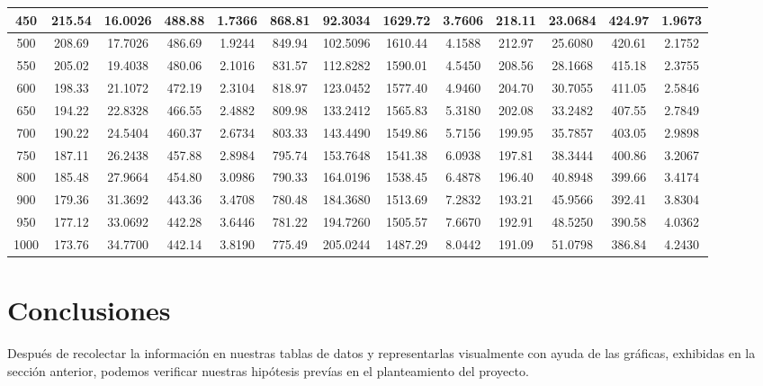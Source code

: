 \documentclass[12pt]{article}
\begin{document}
\begin{table}[ht]
{\begin{tabular}{ |c |c | c | c | c | c | c | c | c | c | c | c | c | }
      450
      & 215.54 & 16.0026 & 488.88 & 1.7366
      & 868.81 & 92.3034 & 1629.72 & 3.7606
      & 218.11 & 23.0684 & 424.97 & 1.9673 \\ \hline
      500
      & 208.69 & 17.7026 & 486.69 & 1.9244
      & 849.94 & 102.5096 & 1610.44 & 4.1588
      & 212.97 & 25.6080 & 420.61 & 2.1752 \\ \hline
      550
      & 205.02 & 19.4038 & 480.06 & 2.1016
      & 831.57 & 112.8282 & 1590.01 & 4.5450
      & 208.56 & 28.1668 & 415.18 & 2.3755 \\ \hline
      600
      & 198.33 & 21.1072 & 472.19 & 2.3104
      & 818.97 & 123.0452 & 1577.40 & 4.9460
      & 204.70 & 30.7055 & 411.05 & 2.5846 \\ \hline
      650
      & 194.22 & 22.8328 & 466.55 & 2.4882
      & 809.98 & 133.2412 & 1565.83 & 5.3180
      & 202.08 & 33.2482 & 407.55 & 2.7849 \\ \hline
      700
      & 190.22 & 24.5404 & 460.37 & 2.6734
      & 803.33 & 143.4490 & 1549.86 & 5.7156
      & 199.95 & 35.7857 & 403.05 & 2.9898 \\ \hline
      750
      & 187.11 & 26.2438 & 457.88 & 2.8984
      & 795.74 & 153.7648 & 1541.38 & 6.0938
      & 197.81 & 38.3444 & 400.86 & 3.2067 \\ \hline
      800
      & 185.48 & 27.9664 & 454.80 & 3.0986
      & 790.33 & 164.0196 & 1538.45 & 6.4878
      & 196.40 & 40.8948 & 399.66 & 3.4174 \\ \hline
      900
      & 179.36 & 31.3692 & 443.36 & 3.4708
      & 780.48 & 184.3680 & 1513.69 & 7.2832
      & 193.21 & 45.9566 & 392.41 & 3.8304 \\ \hline
      950
      & 177.12 & 33.0692 & 442.28 & 3.6446
      & 781.22 & 194.7260 & 1505.57 & 7.6670
      & 192.91 & 48.5250 & 390.58 & 4.0362 \\ \hline
      1000
      & 173.76 & 34.7700 & 442.14 & 3.8190
      & 775.49 & 205.0244 & 1487.29 & 8.0442
      & 191.09 & 51.0798 & 386.84 & 4.2430 \\ \hline
    \end{tabular}
  }
\end{table}
\newpage
\section{Conclusiones}
Después de recolectar la información en nuestras tablas de datos y representarlas visualmente con ayuda de las gráficas, exhibidas en la sección anterior, podemos verificar nuestras hipótesis prevías en el planteamiento del proyecto.
\end{document}
